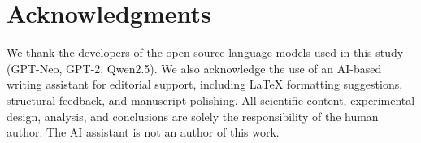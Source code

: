 \documentclass[11pt]{article}
\begin{document}
\section*{Acknowledgments}

We thank the developers of the open-source language models used in this study (GPT-Neo, GPT-2, Qwen2.5). We also acknowledge the use of an AI-based writing assistant for editorial support, including \LaTeX{} formatting suggestions, structural feedback, and manuscript polishing. All scientific content, experimental design, analysis, and conclusions are solely the responsibility of the human author. The AI assistant is not an author of this work.


\end{document}
